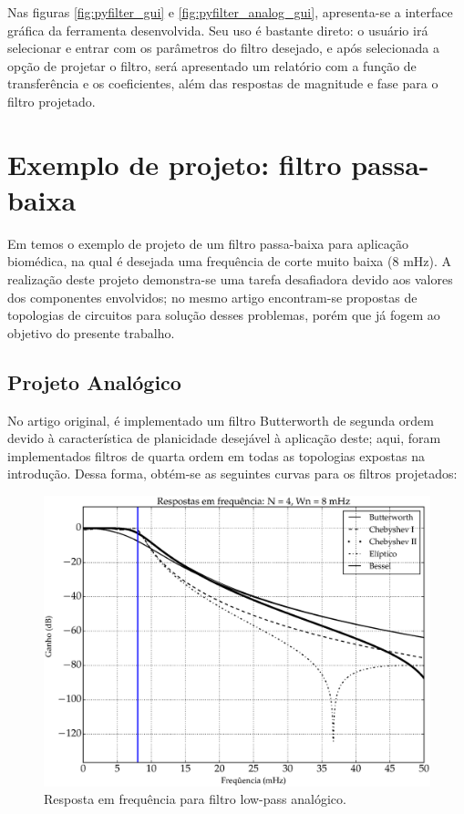 Nas figuras \ref{fig:pyfilter_gui} e \ref{fig:pyfilter_analog_gui}, apresenta-se a interface gráfica da ferramenta desenvolvida. Seu uso é bastante direto: o usuário irá selecionar e entrar com os parâmetros do filtro desejado, e após selecionada a opção de projetar o filtro, será apresentado um relatório com a função de transferência e os coeficientes, além das respostas de magnitude e fase para o filtro projetado.

\section{Exemplo de projeto: filtro passa-baixa}
\label{sec:lowpass}
Em \cite{sancho} temos o exemplo de projeto de um filtro passa-baixa para aplicação biomédica, na qual é desejada uma frequência de corte muito baixa (8 mHz). A realização deste projeto demonstra-se uma tarefa desafiadora devido aos valores dos componentes envolvidos; no mesmo artigo encontram-se propostas de topologias de circuitos para solução desses problemas, porém que já fogem ao objetivo do presente trabalho.

\subsection{Projeto Analógico}
No artigo original, é implementado um filtro Butterworth de segunda ordem devido à característica de planicidade desejável à aplicação deste; aqui, foram implementados filtros de quarta ordem em todas as topologias expostas na introdução. Dessa forma, obtém-se as seguintes curvas para os filtros projetados:

\begin{figure}[H]
  \centering
  \includegraphics[scale=0.55]{images/plots/lowpass_analog}
  \caption{Resposta em frequência para filtro low-pass analógico. }
  \label{fig:lowpass_analog_response}
\end{figure}


